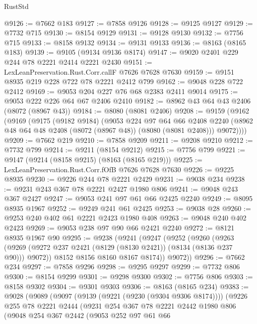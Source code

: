 \begin{lexlean}{RustStd}
\begin{coremodule}
@9126 := @7662 @183
@9127 := @7858 @9126
@9128 := @9125 @9127
@9129 := @7732 @715
@9130 := @8154 @9129
@9131 := @9128 @9130
@9132 := @7756 @715
@9133 := @8158 @9132
@9134 := @9131 @9133
@9136 := @8163 (@8165 @183)
@9139 := @9105 (@9134 @9136 @8174)
@9147 := @9020 @2401 @229 @244 @78 @2221 @2414 @2221 @2430
@9151 := LexLeanPreservation.Rust.Corr.callF @7626 @7628 @7630
@9159 := @9151 @8935 @219 @228 @722 @78 @2221 @2412 @799
@9162 := @9048 @228 @722 @2412
@9169 := @9053 @204 @227 @76 @68 @2383 @2411 @9014
@9175 := @9053 @222 @226 @64 @67 @2406 @2410
@9182 := @8962 @43 @64 @43 @2406 (@8072 (@8967 @43))
@9184 := @8080 (@8081 @2406)
@9208 := @9159
    (@9162
      (@9169
        (@9175
          (@9182 @9184)
          (@9053
            @224
            @97
            @64
            @66
            @2408
            @2240
            (@8962 @48 @64 @48 @2408 (@8072 (@8967 @48)) (@8080 (@8081 @2408)))
            @9072))))
@9209 := @7662 @219
@9210 := @7858 @9209
@9211 := @9208 @9210
@9212 := @7732 @799
@9214 := @9211 (@8154 @9212)
@9215 := @7756 @799
@9221 := @9147 (@9214 (@8158 @9215) (@8163 (@8165 @219)))
@9225 := LexLeanPreservation.Rust.Corr.fOfB @7626 @7628 @7630
@9226 := @9225 @8935
@9230 := @9226 @244 @78 @2221 @2429
@9231 := @9038 @234
@9238 := @9231 @243 @367 @78 @2221 @2427 @1980 @806
@9241 := @9048 @243 @367 @2427
@9247 := @9053 @241 @97 @61 @66 @2425 @2240
@9249 := @8095 @8935 @1967
@9252 := @9249 @241 @61 @2425
@9253 := @9038 @28
@9260 := @9253 @240 @402 @61 @2221 @2423 @1980 @408
@9263 := @9048 @240 @402 @2423
@9269 := @9053 @238 @97 @90 @66 @2421 @2240
@9272 := @8121 @8935 @1967 @90
@9295 := @9238
    (@9241
      (@9247
        (@9252
          (@9260
            (@9263 (@9269 (@9272 @237 @2421 (@8129 (@8130 @2421)) (@8134 (@8136 @237 @90))) @9072))
            @8152
            @8156
            @8160
            @8167
            @8174))
        @9072))
@9296 := @7662 @234
@9297 := @7858 @9296
@9298 := @9295 @9297
@9299 := @7732 @806
@9300 := @8154 @9299
@9301 := @9298 @9300
@9302 := @7756 @806
@9303 := @8158 @9302
@9304 := @9301 @9303
@9306 := @8163 (@8165 @234)
@9383 := @9028
    (@9089
      (@9097
        (@9139 (@9221 (@9230 (@9304 @9306 @8174))))
        (@9226
          @255
          @78
          @2221
          @2444
          (@9231
            @254
            @367
            @78
            @2221
            @2442
            @1980
            @806
            (@9048
              @254
              @367
              @2442
              (@9053
                @252
                @97
                @61
                @66

\end{coremodule}
\end{lexlean}
